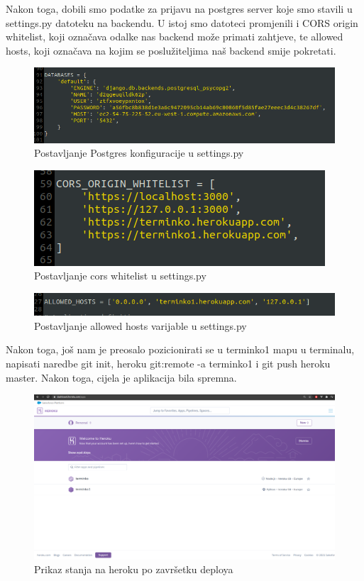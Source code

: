 			Nakon toga, dobili smo podatke za prijavu na postgres server koje smo stavili u settings.py datoteku na backendu. U istoj smo datoteci promjenili i CORS origin whitelist, koji označava odalke nas backend može primati zahtjeve, te allowed hosts, koji označava na kojim se poslužiteljima naš backend smije pokretati.
			
			\begin{figure}[H]
				\centering
				\includegraphics[scale=0.50]{slike/DatabaseData.PNG}
				\caption{Postavljanje Postgres konfiguracije u settings.py}
				\label{fig:promjene}
			\end{figure}
		
			\begin{figure}[H]
				\centering
				\includegraphics[scale=0.80]{slike/CorsWhitelist.PNG}
				\caption{Postavljanje cors whitelist u settings.py}
				\label{fig:promjene}
			\end{figure}
		
			\begin{figure}[H]
				\centering
				\includegraphics[scale=0.60]{slike/AllowedHosts.PNG}
				\caption{Postavljanje allowed hosts varijable u settings.py}
				\label{fig:promjene}
			\end{figure}
		
			Nakon toga, još nam je preosalo pozicionirati se u terminko1 mapu u terminalu, napisati naredbe git init, heroku git:remote -a terminko1 i git push heroku master. Nakon toga, cijela je aplikacija bila spremna. 
			
			\begin{figure}[H]
				\centering
				\includegraphics[scale=0.20]{slike/HerokuAplikacije.PNG}
				\caption{Prikaz stanja na heroku po završetku deploya}
				\label{fig:promjene}
			\end{figure}